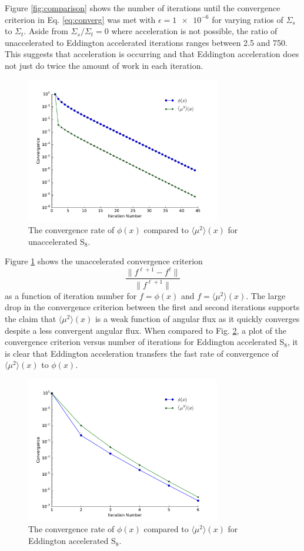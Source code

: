 \documentclass{anstrans}
\newcommand{\edd}{\langle \mu^2 \rangle}
\begin{document}
	Figure \ref{fig:comparison} shows the number of iterations until the convergence criterion in  Eq. \ref{eq:converg} was met with $\epsilon = \num{1e-6}$ for varying ratios of $\Sigma_s$ to $\Sigma_t$. Aside from $\Sigma_s/\Sigma_t = 0$ where acceleration is not possible, the ratio of unaccelerated to Eddington accelerated iterations ranges between 2.5 and 750. This suggests that acceleration is occurring and that Eddington acceleration does not just do twice the amount of work in each iteration. 

	\begin{figure}
		\centering
		\includegraphics[width=8.5cm]{eddCon_si.pdf}
		\caption{The convergence rate of $\phi(x)$ compared to $\edd(x)$ for unaccelerated S$_8$. }
		\label{fig:conv_si}
	\end{figure}

	Figure \ref{fig:conv_si} shows the unaccelerated convergence criterion 
		\begin{equation}
			\frac{\|f^{\ell+1} - f^{\ell}\|}{\|f^{\ell+1}\|}
		\end{equation}
	as a function of iteration number for $f = \phi(x)$ and $f = \edd(x)$. The large drop in the convergence criterion between the first and second iterations supports the claim that $\edd(x)$ is a weak function of angular flux as it quickly converges despite a less convergent angular flux. When compared to Fig. \ref{fig:conv_edd}, a plot of the convergence criterion versus number of iterations for Eddington accelerated S$_8$, it is clear that Eddington acceleration transfers the fast rate of convergence of $\edd(x)$ to $\phi(x)$. 

	\begin{figure}
		\centering
		\includegraphics[width=8.5cm]{eddCon_mu.pdf}
		\caption{The convergence rate of $\phi(x)$ compared to $\edd(x)$ for Eddington accelerated S$_8$.}
		\label{fig:conv_edd}
	\end{figure}
\end{document}
